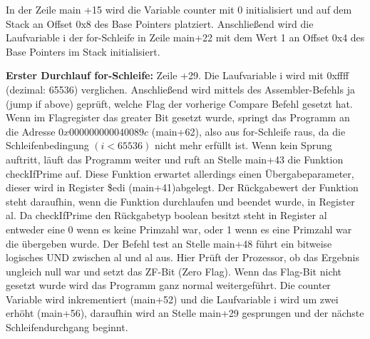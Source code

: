 \documentclass[12pt]{article}
\begin{document}
In der Zeile main +15 wird die Variable counter mit 0 initialisiert und auf dem Stack an Offset 0x8 des Base Pointers platziert. 
Anschließend wird die Laufvariable i der for-Schleife in Zeile main+22 mit dem Wert 1 an Offset 0x4 des Base Pointers im Stack initialisiert.
\par\smallskip\noindent\textbf{Erster Durchlauf for-Schleife: } Zeile +29. Die Laufvariable i wird mit 0xffff (dezimal: 65536) verglichen. Anschließend wird mittels des Assembler-Befehls ja (jump if above) geprüft, welche Flag der vorherige Compare Befehl gesetzt hat. Wenn im Flagregister das greater Bit gesetzt wurde, springt das Programm an die Adresse $0x000000000040089c$ (main+62), also aus for-Schleife raus, da die Schleifenbedingung $(i<65536)$ nicht mehr erfüllt ist. Wenn kein Sprung auftritt, läuft das Programm weiter und ruft an Stelle main+43 die Funktion checkIfPrime auf. Diese Funktion erwartet allerdings einen Übergabeparameter, dieser wird in Register \$edi (main+41)abgelegt. 
Der Rückgabewert der Funktion steht daraufhin, wenn die Funktion durchlaufen und beendet wurde, in Register al. Da checkIfPrime den Rückgabetyp boolean besitzt steht in Register al entweder eine 0 wenn es keine Primzahl war, oder 1 wenn es eine Primzahl war die übergeben wurde. Der Befehl test an Stelle main+48 führt ein bitweise logisches UND zwischen al und al aus. Hier Prüft der Prozessor, ob das Ergebnis ungleich null war und setzt das ZF-Bit (Zero Flag). Wenn das Flag-Bit nicht gesetzt wurde wird das Programm ganz normal weitergeführt. Die counter Variable wird inkrementiert (main+52) und die Laufvariable i wird um zwei erhöht (main+56), daraufhin wird an Stelle main+29 gesprungen und der nächste Schleifendurchgang beginnt.
\end{document}
